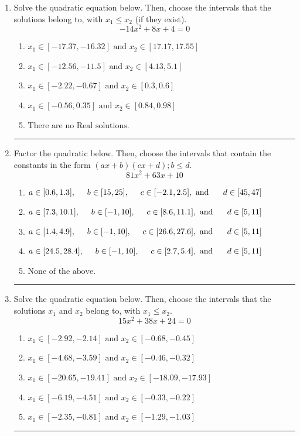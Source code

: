 \documentclass[14pt]{extbook}
\newcommand{\litem}[1]{\item#1\hspace*{-1cm}\rule{\textwidth}{0.4pt}}
\begin{document}
\begin{enumerate}
\litem{
Solve the quadratic equation below. Then, choose the intervals that the solutions belong to, with $x_1 \leq x_2$ (if they exist).\[ -14x^{2} +8 x + 4 = 0 \]\begin{enumerate}[label=\Alph*.]
\item \( x_1 \in [-17.37, -16.32] \text{ and } x_2 \in [17.17, 17.55] \)
\item \( x_1 \in [-12.56, -11.5] \text{ and } x_2 \in [4.13, 5.1] \)
\item \( x_1 \in [-2.22, -0.67] \text{ and } x_2 \in [0.3, 0.6] \)
\item \( x_1 \in [-0.56, 0.35] \text{ and } x_2 \in [0.84, 0.98] \)
\item \( \text{There are no Real solutions.} \)

\end{enumerate} }
\litem{
Factor the quadratic below. Then, choose the intervals that contain the constants in the form $(ax+b)(cx+d); b \leq d.$\[ 81x^{2} +63 x + 10 \]\begin{enumerate}[label=\Alph*.]
\item \( a \in [0.6, 1.3], \hspace*{5mm} b \in [15, 25], \hspace*{5mm} c \in [-2.1, 2.5], \text{ and } \hspace*{5mm} d \in [45, 47] \)
\item \( a \in [7.3, 10.1], \hspace*{5mm} b \in [-1, 10], \hspace*{5mm} c \in [8.6, 11.1], \text{ and } \hspace*{5mm} d \in [5, 11] \)
\item \( a \in [1.4, 4.9], \hspace*{5mm} b \in [-1, 10], \hspace*{5mm} c \in [26.6, 27.6], \text{ and } \hspace*{5mm} d \in [5, 11] \)
\item \( a \in [24.5, 28.4], \hspace*{5mm} b \in [-1, 10], \hspace*{5mm} c \in [2.7, 5.4], \text{ and } \hspace*{5mm} d \in [5, 11] \)
\item \( \text{None of the above.} \)

\end{enumerate} }
\litem{
Solve the quadratic equation below. Then, choose the intervals that the solutions $x_1$ and $x_2$ belong to, with $x_1 \leq x_2$.\[ 15x^{2} +38 x + 24 = 0 \]\begin{enumerate}[label=\Alph*.]
\item \( x_1 \in [-2.92, -2.14] \text{ and } x_2 \in [-0.68, -0.45] \)
\item \( x_1 \in [-4.68, -3.59] \text{ and } x_2 \in [-0.46, -0.32] \)
\item \( x_1 \in [-20.65, -19.41] \text{ and } x_2 \in [-18.09, -17.93] \)
\item \( x_1 \in [-6.19, -4.51] \text{ and } x_2 \in [-0.33, -0.22] \)
\item \( x_1 \in [-2.35, -0.81] \text{ and } x_2 \in [-1.29, -1.03] \)


\end{enumerate}}
\end{enumerate}
\end{document}
